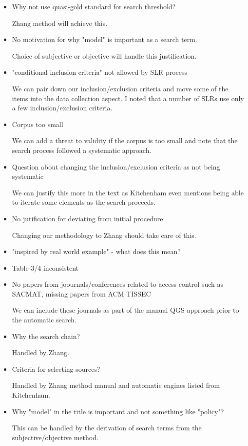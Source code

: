\begin{itemize}
\item Why not use quasi-gold standard for search threshold?

Zhang method will achieve this.

\item No motivation for why "model" is important as a search term.

Choice of subjective or objective will handle this justification.

\item "conditional inclusion criteria" not allowed by SLR process

We can pair down our inclusion/exclusion criteria and move some of the items into the data collection aspect.
I noted that a number of SLRs use only a few inclusion/exclusion criteria.

\item Corpus too small

We can add a threat to validity if the corpus is too small and note that the search process followed a systematic approach.

\item Question about changing the inclusion/exclusion criteria as not being systematic

We can justify this more in the text as Kitchenham even mentions being able to iterate some elements as the search proceeds.

\item No jutification for deviating from initial procedure

Changing our methodology to Zhang should take care of this.

\item "inspired by real world example" - what does this mean?

\item Table 3/4 inconsistent

\item No papers from joournals/conferences related to access control such as SACMAT, missing papers from ACM TISSEC

We can include these journals as part of the manual QGS approach prior to the automatic search.

\item Why the search chain?

Handled by Zhang.

\item Criteria for selecting sources?

Handled by Zhang method manual and automatic engines listed from Kitchenham.

\item Why "model" in the title is important and not something like "policy"?

This can be handled by the derivation of search terms from the subjective/objective method.

\end{itemize}


